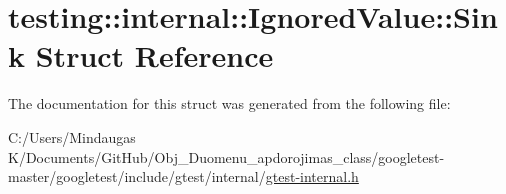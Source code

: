 \hypertarget{structtesting_1_1internal_1_1_ignored_value_1_1_sink}{}\section{testing\+::internal\+::Ignored\+Value\+::Sink Struct Reference}
\label{structtesting_1_1internal_1_1_ignored_value_1_1_sink}


The documentation for this struct was generated from the following file\+:\begin{DoxyCompactItemize}
\item 
C\+:/\+Users/\+Mindaugas K/\+Documents/\+Git\+Hub/\+Obj\+\_\+\+Duomenu\+\_\+apdorojimas\+\_\+class/googletest-\/master/googletest/include/gtest/internal/\mbox{\hyperlink{googletest-master_2googletest_2include_2gtest_2internal_2gtest-internal_8h}{gtest-\/internal.\+h}}\end{DoxyCompactItemize}
